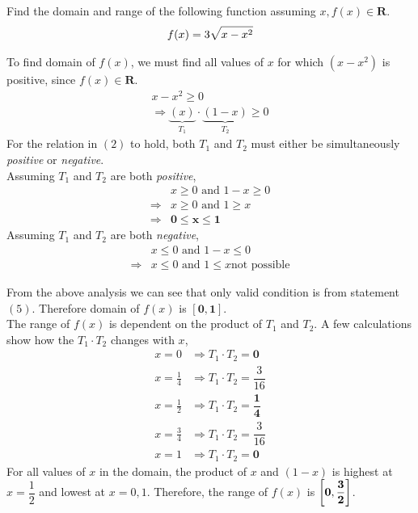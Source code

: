 
\question Find the domain and range of the following 
function assuming $x, f(x) \in \mathbf{R}$.
\begin{align}
  f(x) = 3\sqrt{x-x^2}
\end{align}

\begin{solution}
  To find domain of $f(x)$, we must find all values of $x$ for
  which $(x-x^2)$ is positive, since $f(x) \in \mathbf{R}$.
  \begin{align}
    x-x^2 \geq 0 \\
    \Rightarrow \underbrace{(x)}_{T_1}\cdot\underbrace{(1-x)}_{T_2} \geq 0    
  \end{align}
  For the relation in $(2)$ to hold, both $T_1$ and $T_2$ must either
  be simultaneously \textit{positive} or \textit{negative}.\\
  Assuming $T_1$ and $T_2$ are both \textit{positive},
  \begin{align}
                &x \geq 0 \text{ and } 1 - x \geq 0 \\
    \Rightarrow &x \geq 0 \text{ and } 1 \geq x \\
    \Rightarrow &\mathbf{0 \leq x \leq 1}
  \end{align}
  Assuming $T_1$ and $T_2$ are both \textit{negative},
  \begin{align}
                &x \leq 0 \text{ and } 1 - x \leq 0 \\
    \Rightarrow &x \leq 0 \text{ and } 1 \leq x \text{not possible}
  \end{align}
  
  From the above analysis we can see that only valid condition is 
  from statement $(5)$. Therefore domain of $f(x)$ is $\mathbf{[0,1]}$.\\
  
  The range of $f(x)$ is dependent on the product of $T_1$ and $T_2$. 
  A few calculations show how the $T_1\cdot T_2$ changes with $x$,
  \begin{align}
    x=0          &\Rightarrow T_1\cdot T_2=\mathbf{0} \\
    x=\frac{1}{4}&\Rightarrow T_1\cdot T_2=\dfrac{3}{16} \\
    x=\frac{1}{2}&\Rightarrow T_1\cdot T_2=\mathbf{\dfrac{1}{4}} \\
    x=\frac{3}{4}&\Rightarrow T_1\cdot T_2=\dfrac{3}{16} \\
    x=1          &\Rightarrow T_1\cdot T_2=\mathbf{0}
  \end{align}
  For all values of $x$ in the domain, the product of $x$ and $(1-x)$ 
  is highest at $x=\dfrac{1}{2}$ and lowest at $x=0,1$. Therefore, the
  range of $f(x)$ is $\mathbf{\left[0, \dfrac{3}{2}\right]}$.

\end{solution}

